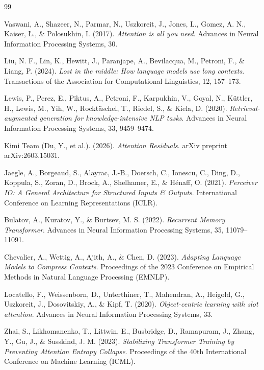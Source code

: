 \documentclass[11pt, a4paper]{article}
\begin{document}
\begin{thebibliography}{99}

Vaswani, A., Shazeer, N., Parmar, N., Uszkoreit, J., Jones, L., Gomez, A. N., Kaiser, \L{}., \& Polosukhin, I. (2017). 
\textit{Attention is all you need}. 
Advances in Neural Information Processing Systems, 30.

Liu, N. F., Lin, K., Hewitt, J., Paranjape, A., Bevilacqua, M., Petroni, F., \& Liang, P. (2024). 
\textit{Lost in the middle: How language models use long contexts}. 
Transactions of the Association for Computational Linguistics, 12, 157--173.

Lewis, P., Perez, E., Piktus, A., Petroni, F., Karpukhin, V., Goyal, N., K\"{u}ttler, H., Lewis, M., Yih, W., Rockt\"{a}schel, T., Riedel, S., \& Kiela, D. (2020). 
\textit{Retrieval-augmented generation for knowledge-intensive NLP tasks}. 
Advances in Neural Information Processing Systems, 33, 9459--9474.

Kimi Team (Du, Y., et al.). (2026). 
\textit{Attention Residuals}. 
arXiv preprint arXiv:2603.15031.

Jaegle, A., Borgeaud, S., Alayrac, J.-B., Doersch, C., Ionescu, C., Ding, D., Koppula, S., Zoran, D., Brock, A., Shelhamer, E., \& H\'{e}naff, O. (2021). 
\textit{Perceiver IO: A General Architecture for Structured Inputs \& Outputs}. 
International Conference on Learning Representations (ICLR).

Bulatov, A., Kuratov, Y., \& Burtsev, M. S. (2022). 
\textit{Recurrent Memory Transformer}. 
Advances in Neural Information Processing Systems, 35, 11079--11091.

Chevalier, A., Wettig, A., Ajith, A., \& Chen, D. (2023). 
\textit{Adapting Language Models to Compress Contexts}. 
Proceedings of the 2023 Conference on Empirical Methods in Natural Language Processing (EMNLP).

Locatello, F., Weissenborn, D., Unterthiner, T., Mahendran, A., Heigold, G., Uszkoreit, J., Dosovitskiy, A., \& Kipf, T. (2020).
\textit{Object-centric learning with slot attention}.
Advances in Neural Information Processing Systems, 33.

Zhai, S., Likhomanenko, T., Littwin, E., Busbridge, D., Ramapuram, J., Zhang, Y., Gu, J., \& Susskind, J. M. (2023).
\textit{Stabilizing Transformer Training by Preventing Attention Entropy Collapse}.
Proceedings of the 40th International Conference on Machine Learning (ICML).

\end{thebibliography}
\end{document}
